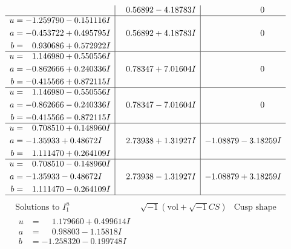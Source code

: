 \documentclass[1p]{elsarticle_modified}
\theoremstyle{definition}
\newcommand{\I}{\sqrt{-1}}
\begin{document}
$$\begin{array}{c|c|c}
 & \phantom{-}0.56892 - 4.18783 I & \phantom{-0.000000 } 0 \\ \hline\begin{aligned}
u &= -1.259790 - 0.151116 I \\
a &= -0.453722 + 0.495795 I \\
b &= \phantom{-}0.930686 + 0.572922 I\end{aligned}
 & \phantom{-}0.56892 + 4.18783 I & \phantom{-0.000000 } 0 \\ \hline\begin{aligned}
u &= \phantom{-}1.146980 + 0.550556 I \\
a &= -0.862666 + 0.240336 I \\
b &= -0.415566 + 0.872115 I\end{aligned}
 & \phantom{-}0.78347 + 7.01604 I & \phantom{-0.000000 } 0 \\ \hline\begin{aligned}
u &= \phantom{-}1.146980 - 0.550556 I \\
a &= -0.862666 - 0.240336 I \\
b &= -0.415566 - 0.872115 I\end{aligned}
 & \phantom{-}0.78347 - 7.01604 I & \phantom{-0.000000 } 0 \\ \hline\begin{aligned}
u &= \phantom{-}0.708510 + 0.148960 I \\
a &= -1.35933 + 0.48672 I \\
b &= \phantom{-}1.111470 + 0.264109 I\end{aligned}
 & \phantom{-}2.73938 + 1.31927 I & -1.08879 - 3.18259 I \\ \hline\begin{aligned}
u &= \phantom{-}0.708510 - 0.148960 I \\
a &= -1.35933 - 0.48672 I \\
b &= \phantom{-}1.111470 - 0.264109 I\end{aligned}
 & \phantom{-}2.73938 - 1.31927 I & -1.08879 + 3.18259 I\\
 \hline 
 \end{array}$$\newpage$$\begin{array}{c|c|c}  
\text{Solutions to }I^u_{1}& \I (\text{vol} + \sqrt{-1}CS) & \text{Cusp shape}\\
 \hline 
\begin{aligned}
u &= \phantom{-}1.179660 + 0.499614 I \\
a &= \phantom{-}0.98803 - 1.15818 I \\
b &= -1.258320 - 0.199748 I\end{aligned}

\end{array}$$
\end{document}

